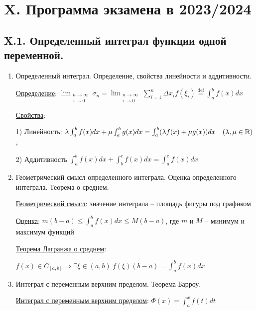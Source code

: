 \documentclass[12pt]{article}
\begin{document}
    \clearpage

    \section{X. Программа экзамена в 2023/2024}

    \subsection{X.1. Определенный интеграл функции одной переменной.}

    \begin{enumerate}
        \item Определенный интеграл. Определение, свойства линейности и аддитивности.

        \hyperlink{integraldefinition}{Определение}: $\lim_{\substack{n\to\infty \\ \tau\to0}} \sigma_n = \lim_{\substack{n\to\infty \\ \tau\to0}} \sum^n_{i=1} \Delta x_i f(\xi_i) \stackrel{\text{def}}{=} \int_a^b f(x)dx$

        \hyperlink{integralproperties}{Свойства}:

        1) Линейность: $\lambda \int^b_a f(x)dx + \mu \int^b_a g(x)dx = \int^b_a (\lambda f(x) + \mu g(x)) dx \quad (\lambda, \mu \in \mathbb{R})$,

        2) Аддитивность $\int^b_a f(x)dx + \int^c_b f(x)dx = \int^c_a f(x)dx$

        \item Геометрический смысл определенного интеграла. Оценка определенного интеграла. Теорема о среднем.

        \hyperlink{integralgeommeaning}{Геометрический смысл}: значение интеграла -- площадь фигуры под графиком

        \hyperlink{integralevaluation}{Оценка}: $m (b-a) \leq \int^b_a f(x)dx \leq M(b - a)$, где $m$ и $M$ -- минимум и максимум функций

        \hyperlink{theoremlagrangeaboutaverage}{Теорема Лагранжа о среднем}:

        $f(x) \in C_{[a,b]} \Longrightarrow \exists \xi \in (a, b) \ f(\xi)(b - a) = \int^b_a f(x)dx$


        \item Интеграл с переменным верхним пределом. Теорема Барроу.

        \hyperlink{integralwithvariableupperlimit}{Интеграл с переменным верхним пределом}: $\Phi(x) = \int^x_a f(t) dt$


\end{enumerate}
\end{document}
